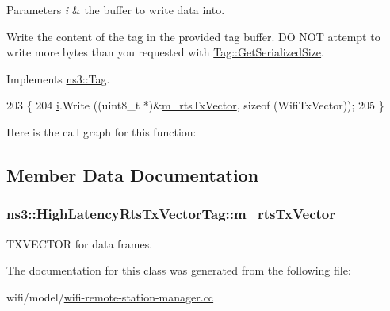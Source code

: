 \begin{DoxyParams}{Parameters}
{\em i} & the buffer to write data into.\\
\hline
\end{DoxyParams}
Write the content of the tag in the provided tag buffer. DO N\+OT attempt to write more bytes than you requested with \hyperlink{classns3_1_1Tag_a01c8efdea943fd8cce2ef5d4d67eefa6}{Tag\+::\+Get\+Serialized\+Size}. 

Implements \hyperlink{classns3_1_1Tag_ac9aa7c4f923da5d2c82de94690101dc3}{ns3\+::\+Tag}.


\begin{DoxyCode}
203 \{
204   \hyperlink{bernuolliDistribution_8m_a6f6ccfcf58b31cb6412107d9d5281426}{i}.Write ((uint8\_t *)&\hyperlink{classns3_1_1HighLatencyRtsTxVectorTag_a368b4acac986dd390e4f03e9f082dcf1}{m\_rtsTxVector}, \textcolor{keyword}{sizeof} (WifiTxVector));
205 \}
\end{DoxyCode}


Here is the call graph for this function\+:




\subsection{Member Data Documentation}
\subsubsection[{\texorpdfstring{m\+\_\+rts\+Tx\+Vector}{m_rtsTxVector}}]{ ns3\+::\+High\+Latency\+Rts\+Tx\+Vector\+Tag\+::m\+\_\+rts\+Tx\+Vector\hspace{0.3cm}{\ttfamily [private]}}\hypertarget{classns3_1_1HighLatencyRtsTxVectorTag_a368b4acac986dd390e4f03e9f082dcf1}{}\label{classns3_1_1HighLatencyRtsTxVectorTag_a368b4acac986dd390e4f03e9f082dcf1}


T\+X\+V\+E\+C\+T\+OR for data frames. 



The documentation for this class was generated from the following file\+:\begin{DoxyCompactItemize}
\item 
wifi/model/\hyperlink{wifi-remote-station-manager_8cc}{wifi-\/remote-\/station-\/manager.\+cc}\end{DoxyCompactItemize}
